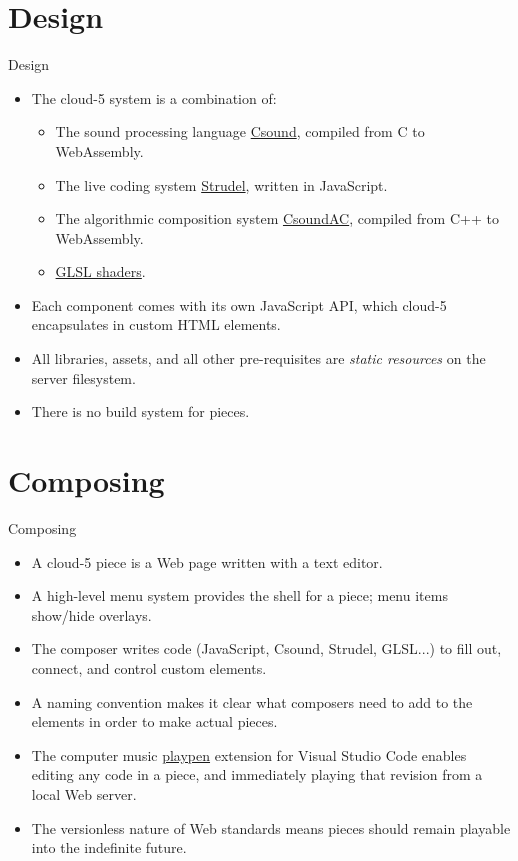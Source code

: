 \documentclass{beamer}
\begin{document}
\section{Design}
\begin{frame}{Design}
\begin{itemize}
\item The cloud-5 system is a combination of:
\begin{itemize}
\item The sound processing language \href{https://csound.com/}{Csound}, compiled from C to WebAssembly.
\item The live coding system \href{https://strudel.cc}{Strudel}, written in JavaScript.
\item The algorithmic composition system \href{https://github.com/gogins/csound-ac/blob/master/README.md}{CsoundAC}, compiled from C++ to WebAssembly.
\item \href{https://www.shadertoy.com/}{GLSL shaders}.
\end{itemize}
\item Each component comes with its own JavaScript API, which cloud-5 encapsulates in custom HTML elements.
\item All libraries, assets, and all other pre-requisites are \emph{static resources} on the server filesystem.
\item There is no build system for pieces.

\end{itemize}
\end{frame}

\section{Composing}

\begin{frame}{Composing}
\begin{itemize}
\item A cloud-5 piece is a Web page written with a text editor.
\item A high-level menu system provides the shell for a piece; menu items show/hide overlays.
\item The composer writes code (JavaScript, Csound, Strudel, GLSL...) to fill out, connect, and control custom elements.
\item A naming convention makes it clear what composers need to add to the elements in order to make actual pieces.
\item The computer music \href{https://github.com/gogins/csound-ac/tree/master/vscode-playpen}{playpen} extension for Visual Studio Code enables editing any code in a piece, and immediately playing that revision from a local Web server.
\item The versionless nature of Web standards means pieces should remain playable into the indefinite future.
\end{itemize}
\end{frame}
\end{document}
